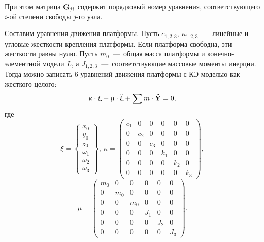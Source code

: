 При этом матрица $ \mathbf{G}_{ji} $ содержит порядковый номер уравнения, соответствующего $ i $-ой степени свободы $ j $-го узла.

Составим уравнения движения платформы. Пусть $ c_{1,2,3}, \ \kappa_{1,2,3} $~---~линейные и угловые жесткости крепления платформы. Если платформа свободна, эти жесткости равны нулю. Пусть $ m_0 $~---~общая масса платформы и конечно-элементной модели $ L $, а  $ J_{1,2,3} $~---~соответствующие массовые моменты инерции. Тогда можно записать 6 уравнений движения платформы с КЭ-моделью как жесткого целого:
\begin{equation}
	\upkappa \cdot \upxi + \upmu \cdot \ddot{\upxi} + \sum m \cdot \ddot{\mathbf{Y}} = 0,
	\label{eq:motionPlatform}
\end{equation}
где
\begin{equation}
	\xi =
	\begin{Bmatrix}
		x_0 \\ y_0 \\ z_0 \\ \omega_1 \\ \omega_2 \\ \omega_3
	\end{Bmatrix}, \
	\kappa =
	\begin{pmatrix}
		c_1 & 0 & 0 & 0 & 0 & 0 \\
		0 & c_2 & 0 & 0 & 0 & 0 \\
		0 & 0 & c_3 & 0 & 0 & 0 \\
		0 & 0 & 0 & k_1 & 0 & 0 \\
		0 & 0 & 0 & 0 & k_2 & 0 \\
		0 & 0 & 0 & 0 & 0 & k_3
	\end{pmatrix},
\end{equation}
\begin{equation}
	\mu =
	\begin{pmatrix}
		m_0 & 0 & 0 & 0 & 0 & 0 \\
		0 & m_0 & 0 & 0 & 0 & 0 \\
		0 & 0 & m_0 & 0 & 0 & 0 \\
		0 & 0 & 0 & J_1 & 0 & 0 \\
		0 & 0 & 0 & 0 & J_2 & 0 \\
		0 & 0 & 0 & 0 & 0 & J_3
	\end{pmatrix}.
\end{equation}

